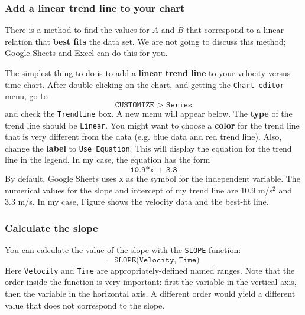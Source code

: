 \subsubsection{Add a linear trend line to your chart}
There is a method to find the values for $A$ and $B$ that correspond to a linear relation that \textbf{best fits} the data set. We are not going to discuss this method; Google Sheets and Excel can do this for you.

The simplest thing to do is to add a \textbf{linear trend line} to your velocity versus time chart. After double clicking on the chart, and getting the \texttt{Chart editor} menu, go to
\begin{equation}
    \texttt{CUSTOMIZE > Series}
\end{equation}
and check the \texttt{Trendline} box. A new menu will appear below. The \textbf{type} of the trend line should be \texttt{Linear}. You might want to choose a \textbf{color} for the trend line that is very different from the data (e.g. blue data and red trend line). Also, change the \textbf{label} to \texttt{Use Equation}. This will display the equation for the trend line in the legend. In my case, the equation has the form
\begin{equation}
    \texttt{10.9*x + 3.3}
\end{equation}
By default, Google Sheets uses \texttt{x} as the symbol for the independent variable. The numerical values for the slope and intercept of my trend line are 10.9 m/s$^{2}$ and 3.3 m/s. In my case, Figure shows the velocity data and the best-fit line.
\subsubsection{Calculate the slope}
You can calculate the value of the slope with the \texttt{SLOPE} function:
\begin{equation}
    \texttt{=SLOPE(Velocity, Time)}
\end{equation}
Here \texttt{Velocity} and \texttt{Time} are appropriately-defined named ranges. Note that the order inside the function is very important: first the variable in the vertical axis, then the variable in the horizontal axis. A different order would yield a different value that does not correspond to the slope.

